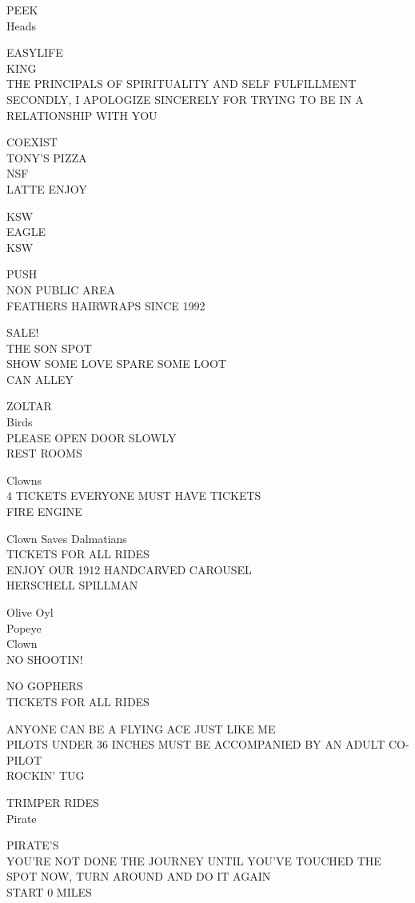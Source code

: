 \documentclass[10pt,letterpaper]{article}
\begin{document}
PEEK\\
Heads

EASYLIFE\\
KING\\
THE PRINCIPALS OF SPIRITUALITY AND SELF FULFILLMENT\\
SECONDLY, I APOLOGIZE SINCERELY FOR TRYING TO BE IN A RELATIONSHIP WITH YOU

COEXIST\\
TONY'S PIZZA\\
NSF\\
LATTE ENJOY

KSW\\
EAGLE\\
KSW

PUSH\\
NON PUBLIC AREA\\
FEATHERS HAIRWRAPS SINCE 1992

SALE!\\
THE SON SPOT\\
SHOW SOME LOVE SPARE SOME LOOT\\
CAN ALLEY

ZOLTAR\\
Birds\\
PLEASE OPEN DOOR SLOWLY\\
REST ROOMS

Clowns\\
4 TICKETS EVERYONE MUST HAVE TICKETS\\
FIRE ENGINE

Clown Saves Dalmatians\\
TICKETS FOR ALL RIDES\\
ENJOY OUR 1912 HANDCARVED CAROUSEL\\
HERSCHELL SPILLMAN

Olive Oyl\\
Popeye\\
Clown\\
NO SHOOTIN!

NO GOPHERS\\
TICKETS FOR ALL RIDES

ANYONE CAN BE A FLYING ACE JUST LIKE ME\\
PILOTS UNDER 36 INCHES MUST BE ACCOMPANIED BY AN ADULT CO{-}PILOT\\
ROCKIN' TUG

TRIMPER RIDES\\
Pirate

PIRATE'S\\
YOU'RE NOT DONE THE JOURNEY UNTIL YOU'VE TOUCHED THE SPOT NOW, TURN AROUND AND DO IT AGAIN\\
START 0 MILES
\end{document}
